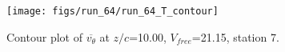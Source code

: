 \begin{figure}[H]
\centering
\texttt{[image: figs/run\_64/run\_64\_T\_contour]}
\caption{Contour plot of $\overline{v_{\theta}}$ at $z/c$=10.00, $V_{free}$=21.15, station 7.}
\label{fig:run_64_T_contour}
\end{figure}


